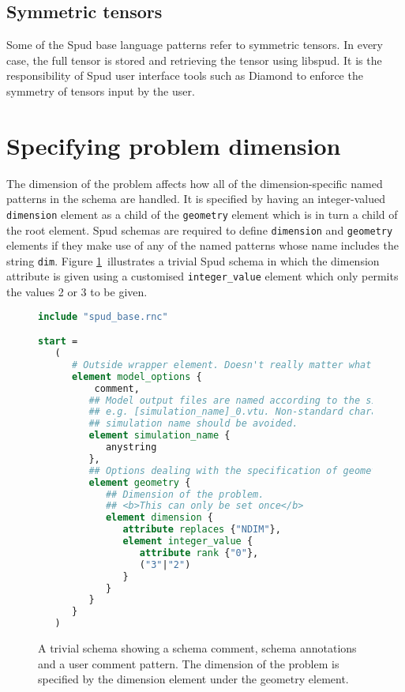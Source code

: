 \documentclass[a4paper, 11pt]{book}
\begin{document}
\subsection{Symmetric tensors}

Some of the Spud base language patterns refer to symmetric tensors. In every
case, the full tensor is stored and retrieving the tensor using libspud. It
is the responsibility of Spud user interface tools such as Diamond to
enforce the symmetry of tensors input by the user.

\section{Specifying problem dimension }

The dimension of the problem affects how all of the dimension-specific named
patterns in the schema are handled. It is specified by having an
integer-valued \lstinline+dimension+ element as a child of the
\lstinline+geometry+ element which is in turn a child of the root
element. Spud schemas are required to define \lstinline+dimension+ and
\lstinline+geometry+ elements if they make use of any of the
named patterns whose name includes the string \verb+dim+. Figure
\ref{fig:schema}\ illustrates a trivial Spud schema in which the dimension
attribute is given using a customised \lstinline+integer_value+ element
which only permits the values 2 or 3 to be given.

\begin{figure}[t]
\begin{lstlisting}[language=rnc,frame=trBL]
include "spud_base.rnc"

start =
   (
      # Outside wrapper element. Doesn't really matter what the name is.
      element model_options {
          comment,
         ## Model output files are named according to the simulation name,
         ## e.g. [simulation_name]_0.vtu. Non-standard characters in the
         ## simulation name should be avoided.
         element simulation_name {
            anystring
         },
         ## Options dealing with the specification of geometry
         element geometry {
            ## Dimension of the problem.
            ## <b>This can only be set once</b>
            element dimension {
               attribute replaces {"NDIM"},
               element integer_value {
                  attribute rank {"0"},
                  ("3"|"2")
               }
            }
         }
      }
   )
\end{lstlisting}

  \caption{A trivial schema showing a schema comment, schema annotations and
  a user comment pattern. The dimension of the problem is specified by the
  dimension element under the geometry element.}
  \label{fig:schema}

\end{figure}
\end{document}
